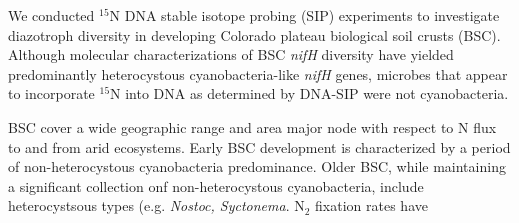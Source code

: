 We conducted $^{15}$N DNA stable isotope probing (SIP) experiments to investigate diazotroph diversity in developing Colorado plateau biological soil crusts (BSC). Although molecular characterizations of BSC \textit{nifH} diversity have yielded predominantly heterocystous cyanobacteria-like \textit{nifH} genes, microbes that appear to incorporate $^{15}$N into DNA as determined by DNA-SIP were not cyanobacteria.

BSC cover a wide geographic range and area major node with respect to N flux to and from arid ecosystems. Early BSC development is characterized by a period of non-heterocystous cyanobacteria predominance. Older BSC, while maintaining a significant collection onf non-heterocystous cyanobacteria, include heterocystsous types (e.g. \textit{Nostoc, Syctonema}. N$_{2}$ fixation rates have    


